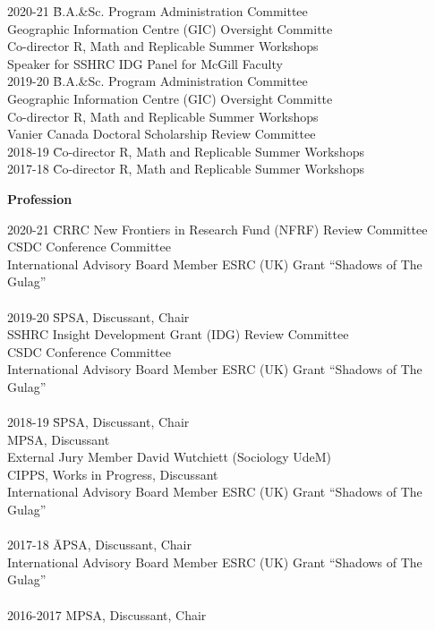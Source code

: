 \documentclass[margin,line]{res}
\begin{document}
{\begin{resume}
\begin{tabbing}
  2020-21 \= B.A.\&Sc. Program Administration Committee \\
\> Geographic Information Centre (GIC) Oversight Committe \\
\> Co-director  R, Math and Replicable Summer Workshops \\
\> Speaker for SSHRC IDG Panel for McGill Faculty \\
2019-20 \= B.A.\&Sc. Program Administration Committee \\
\> Geographic Information Centre (GIC) Oversight Committe \\
\> Co-director  R, Math and Replicable Summer Workshops \\
\> Vanier Canada Doctoral Scholarship Review Committee \\
2018-19 \=  Co-director  R, Math and Replicable Summer Workshops\\
2017-18 \=  Co-director  R, Math and Replicable Summer Workshops
\end{tabbing}


\textbf{Profession}\\
\vspace{-3em}

\begin{tabbing}
  2020-21 \= CRRC New Frontiers in
Research Fund (NFRF) Review Committee \\
\> CSDC Conference Committee \\
\> International Advisory Board Member ESRC (UK) Grant ``Shadows of
The Gulag''\\
\\

2019-20 \=  SPSA, Discussant, Chair\\
\> SSHRC Insight Development Grant (IDG) Review Committee\\
\> CSDC Conference Committee \\
\> International Advisory Board Member ESRC (UK) Grant ``Shadows of
The Gulag''\\
\\
  
2018-19 \=  SPSA, Discussant, Chair\\
\> MPSA, Discussant \\
\> External Jury Member David Wutchiett (Sociology UdeM) \\
\> CIPPS, Works in Progress, Discussant\\
\> International Advisory Board Member ESRC (UK) Grant ``Shadows of
The Gulag''\\
\\
2017-18 \=  APSA, Discussant, Chair\\
\> International Advisory Board Member ESRC (UK) Grant ``Shadows of
The Gulag''\\
\\
2016-2017 MPSA, Discussant, Chair \\
\end{tabbing}
\vspace{-2em}


\end{resume}}
\end{document}
